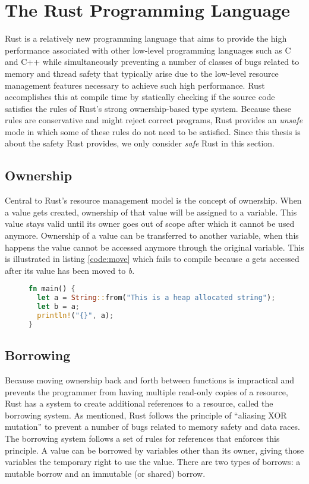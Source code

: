 \section{The Rust Programming Language}
\label{sec:rustbackground}
Rust is a relatively new programming language that aims to provide the high performance associated with other low-level programming languages such as C and C++ while simultaneously preventing a number of classes of bugs related to memory and thread safety that typically arise due to the low-level resource management features necessary to achieve such high performance.
Rust accomplishes this at compile time by statically checking if the source code satisfies the rules of Rust's strong ownership-based type system.
Because these rules are conservative and might reject correct programs, Rust provides an \textit{unsafe} mode in which some of these rules do not need to be satisfied.
Since this thesis is about the safety Rust provides, we only consider \textit{safe} Rust in this section.

\subsection{Ownership}
Central to Rust's resource management model is the concept of ownership.
When a value gets created, ownership of that value will be assigned to a variable.
This value stays valid until its owner goes out of scope after which it cannot be used anymore.
Ownership of a value can be transferred to another variable, when this happens the value cannot be accessed anymore through the original variable.
This is illustrated in listing \ref{code:move} which fails to compile because \textit{a} gets accessed after its value has been moved to \textit{b}.

\begin{figure}[h]
\begin{lstlisting}[language=Rust,frame=single,caption=Moving a variable.,label=code:move]
fn main() {
  let a = String::from("This is a heap allocated string");
  let b = a;
  println!("{}", a);
}
\end{lstlisting}
\end{figure}

\subsection{Borrowing}
\label{subsec:borrowing}
Because moving ownership back and forth between functions is impractical and prevents the programmer from having multiple read-only copies of a resource, Rust has a system to create additional references to a resource, called the borrowing system.
As mentioned, Rust follows the principle of ``aliasing XOR mutation'' to prevent a number of bugs related to memory safety and data races.
The borrowing system follows a set of rules for references that enforces this principle.
A value can be borrowed by variables other than its owner, giving those variables the temporary right to use the value.
There are two types of borrows: a mutable borrow and an immutable (or shared) borrow. 

